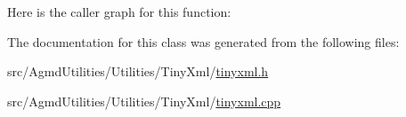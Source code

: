 Here is the caller graph for this function\+:




The documentation for this class was generated from the following files\+:\begin{DoxyCompactItemize}
\item 
src/\+Agmd\+Utilities/\+Utilities/\+Tiny\+Xml/\hyperlink{tinyxml_8h}{tinyxml.\+h}\item 
src/\+Agmd\+Utilities/\+Utilities/\+Tiny\+Xml/\hyperlink{tinyxml_8cpp}{tinyxml.\+cpp}\end{DoxyCompactItemize}
